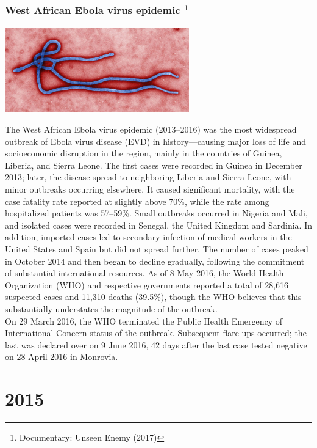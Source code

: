 \documentclass[11pt]{report}
\begin{document}
\subsection{West African Ebola virus epidemic \protect\footnote{Documentary: Unseen Enemy (2017)}}
\vspace{2mm}\begin{center}\includegraphics[width=8cm]{./img/ebola.jpg}\end{center}
The West African Ebola virus epidemic (2013–2016) was the most widespread outbreak of Ebola virus disease (EVD) in history—causing major loss of life and socioeconomic disruption in the region, mainly in the countries of Guinea, Liberia, and Sierra Leone. The first cases were recorded in Guinea in December 2013; later, the disease spread to neighboring Liberia and Sierra Leone, with minor outbreaks occurring elsewhere. It caused significant mortality, with the case fatality rate reported at slightly above 70\%, while the rate among hospitalized patients was 57–59\%. Small outbreaks occurred in Nigeria and Mali, and isolated cases were recorded in Senegal, the United Kingdom and Sardinia. In addition, imported cases led to secondary infection of medical workers in the United States and Spain but did not spread further. The number of cases peaked in October 2014 and then began to decline gradually, following the commitment of substantial international resources. As of 8 May 2016, the World Health Organization (WHO) and respective governments reported a total of 28,616 suspected cases and 11,310 deaths (39.5\%), though the WHO believes that this substantially understates the magnitude of the outbreak.\\
\indent On 29 March 2016, the WHO terminated the Public Health Emergency of International Concern status of the outbreak. Subsequent flare-ups occurred; the last was declared over on 9 June 2016, 42 days after the last case tested negative on 28 April 2016 in Monrovia.

\chapter{2015}
\end{document}
